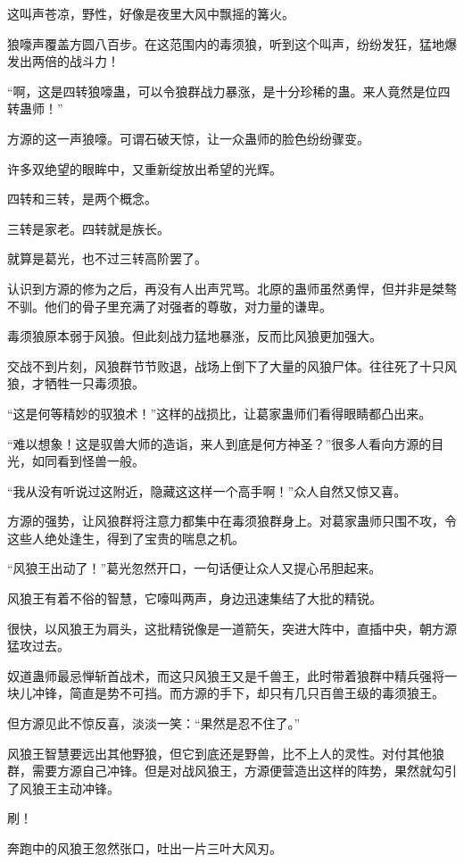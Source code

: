 \begin{this_body}
这叫声苍凉，野性，好像是夜里大风中飘摇的篝火。

狼嚎声覆盖方圆八百步。在这范围内的毒须狼，听到这个叫声，纷纷发狂，猛地爆发出两倍的战斗力！

“啊，这是四转狼嚎蛊，可以令狼群战力暴涨，是十分珍稀的蛊。来人竟然是位四转蛊师！”

方源的这一声狼嚎。可谓石破天惊，让一众蛊师的脸色纷纷骤变。

许多双绝望的眼眸中，又重新绽放出希望的光辉。

四转和三转，是两个概念。

三转是家老。四转就是族长。

就算是葛光，也不过三转高阶罢了。

认识到方源的修为之后，再没有人出声咒骂。北原的蛊师虽然勇悍，但并非是桀骜不驯。他们的骨子里充满了对强者的尊敬，对力量的谦卑。

毒须狼原本弱于风狼。但此刻战力猛地暴涨，反而比风狼更加强大。

交战不到片刻，风狼群节节败退，战场上倒下了大量的风狼尸体。往往死了十只风狼，才牺牲一只毒须狼。

“这是何等精妙的驭狼术！”这样的战损比，让葛家蛊师们看得眼睛都凸出来。

“难以想象！这是驭兽大师的造诣，来人到底是何方神圣？”很多人看向方源的目光，如同看到怪兽一般。

“我从没有听说过这附近，隐藏这这样一个高手啊！”众人自然又惊又喜。

方源的强势，让风狼群将注意力都集中在毒须狼群身上。对葛家蛊师只围不攻，令这些人绝处逢生，得到了宝贵的喘息之机。

“风狼王出动了！”葛光忽然开口，一句话便让众人又提心吊胆起来。

风狼王有着不俗的智慧，它嚎叫两声，身边迅速集结了大批的精锐。

很快，以风狼王为肩头，这批精锐像是一道箭矢，突进大阵中，直插中央，朝方源猛攻过去。

奴道蛊师最忌惮斩首战术，而这只风狼王又是千兽王，此时带着狼群中精兵强将一块儿冲锋，简直是势不可挡。而方源的手下，却只有几只百兽王级的毒须狼王。

但方源见此不惊反喜，淡淡一笑：“果然是忍不住了。”

风狼王智慧要远出其他野狼，但它到底还是野兽，比不上人的灵性。对付其他狼群，需要方源自己冲锋。但是对战风狼王，方源便营造出这样的阵势，果然就勾引了风狼王主动冲锋。

刷！

奔跑中的风狼王忽然张口，吐出一片三叶大风刃。


\end{this_body}
